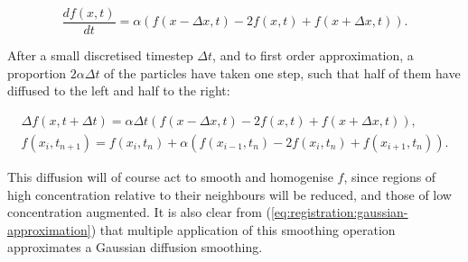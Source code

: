     \begin{equation}
	    \frac{d f(x, t)}{d t} = \alpha (f(x - \Delta x, t) - 2f(x, t) + f(x + \Delta x, t)).
    \end{equation}
    
    After a small discretised timestep $\Delta t$, and to first order approximation, a proportion $2\alpha \Delta t$ of the particles have taken one step, such that half of them have diffused to the left and half to the right:
  	
	  \begin{gather}
	    \Delta f(x, t + \Delta t) = \alpha \Delta t(f(x - \Delta x, t) - 2f(x, t) + f(x + \Delta x, t)), \\
	    f(x_i, t_{n+1}) = f(x_i, t_n) + \alpha (f(x_{i-1}, t_n) - 2f(x_i, t_n) + f(x_{i+1}, t_n)). \label{eqn:diffusion_1d}
		\end{gather}
  	
	  This diffusion will of course act to smooth and homogenise $f$, since regions of high concentration relative to their neighbours will be reduced, and those of low concentration augmented. It is also clear from (\ref{eq:registration:gaussian-approximation}) that multiple application of this smoothing operation approximates a Gaussian diffusion smoothing.
		
	
